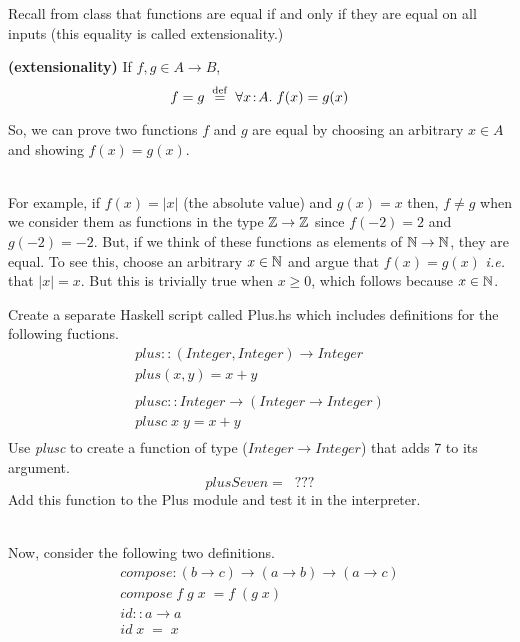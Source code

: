 \documentclass[11pt]{article}
\begin{document}


Recall from class that functions are equal if and only if they are equal on all
inputs (this equality is called extensionality.)

\begin{definition}{{\bf{(extensionality)}}}
If $f,g\in{}A\rightarrow{}B$,
\[ f = g \; \;{\stackrel{\rm def}{=}}\;\; \forall{}x\!:\!A.\; f(x) = g(x) \]
\end{definition}

So, we can prove two functions $f$ and $g$ are equal by choosing an arbitrary
$x\in{}A$ and showing $f(x) = g(x)$.

\ \\ For example, if $f(x) = |x|$ (the absolute value) and $g(x) = x$ then,
$f\not={}g$ when we consider them as functions in the type ${\mathbb{Z}} \rightarrow
{\mathbb{Z}}$ since $f(-2) = 2$ and $g(-2)=-2$.  But, if we think of these functions as
elements of ${\mathbb{N}}\rightarrow{\mathbb{N}}$, they are equal.  To see this, choose an
arbitrary $x\in{\mathbb{N}}$ and argue that $f(x) = g(x)$ {\em{i.e.}}  that $|x|=x$.
But this is trivially true when $x \ge 0$, which follows because $x\in{\mathbb{N}}$.  \
\\

\begin{problem}
Create a separate Haskell script called Plus.hs which includes definitions for the following fuctions.
\[\begin{array}{l}
plus :: (Integer,Integer) \rightarrow Integer \\
plus(x,y) = x + y \\
 \\
plusc :: Integer \rightarrow (Integer \rightarrow Integer) \\
plusc \; x \; y = x + y \\
\end{array}\]
Use {\it{plusc}} to create a function of type ($Integer \rightarrow Integer$)
that adds 7 to its argument.
\[plusSeven = \;\; ??? \]
Add this function to the Plus module and test it in the interpreter.
\end{problem}
\ \\
\goodbreak\noindent{}Now, consider the following two definitions.
\vspace{.06125in}
\[\begin{array}{ll}
compose : (b \rightarrow c) \rightarrow (a \rightarrow b ) \rightarrow (a \rightarrow c)\\
compose \; f \; g \; x \; = f\;  (g \; x) \\
id :: a \rightarrow a \\
id \; x \; = \; x   \\
\end{array}
\]
\end{document}
